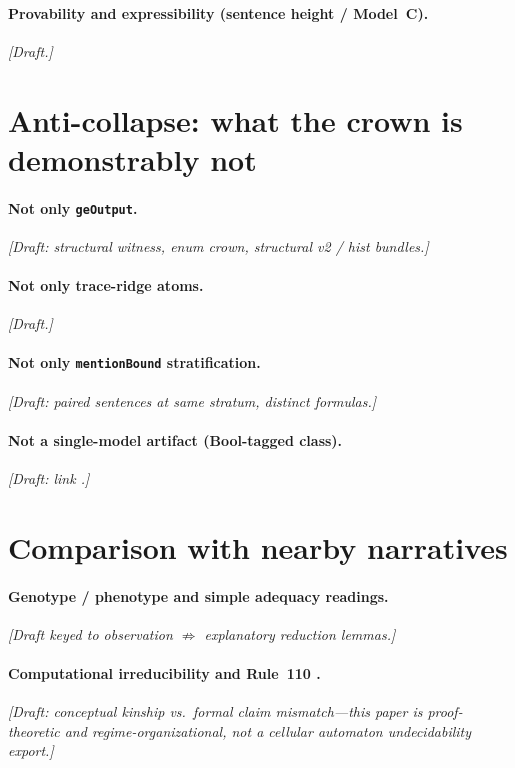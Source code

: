 \documentclass[11pt,a4paper]{article}
\theoremstyle{definition}
\begin{document}
\paragraph{Provability and expressibility (sentence height / Model~C).}
\emph{[Draft.]}

\section{Anti-collapse: what the crown is demonstrably not}\label{sec:anti-collapse}

\paragraph{Not only \texttt{geOutput}.}
\emph{[Draft: structural witness, enum crown, structural v2 / hist bundles.]}

\paragraph{Not only trace-ridge atoms.}
\emph{[Draft.]}

\paragraph{Not only \texttt{mentionBound} stratification.}
\emph{[Draft: paired sentences at same stratum, distinct formulas.]}

\paragraph{Not a single-model artifact (Bool-tagged class).}
\emph{[Draft: link
.]}

\section{Comparison with nearby narratives}\label{sec:comparison}

\paragraph{Genotype / phenotype and simple adequacy readings.}
\emph{[Draft keyed to observation $\not\Rightarrow$ explanatory reduction lemmas.]}

\paragraph{Computational irreducibility \cite{Wolfram2002} and Rule~110 \cite{Cook2004}.}
\emph{[Draft: conceptual kinship vs.\ formal claim mismatch---this paper is proof-theoretic and regime-organizational, not a cellular automaton undecidability export.]}
\end{document}
